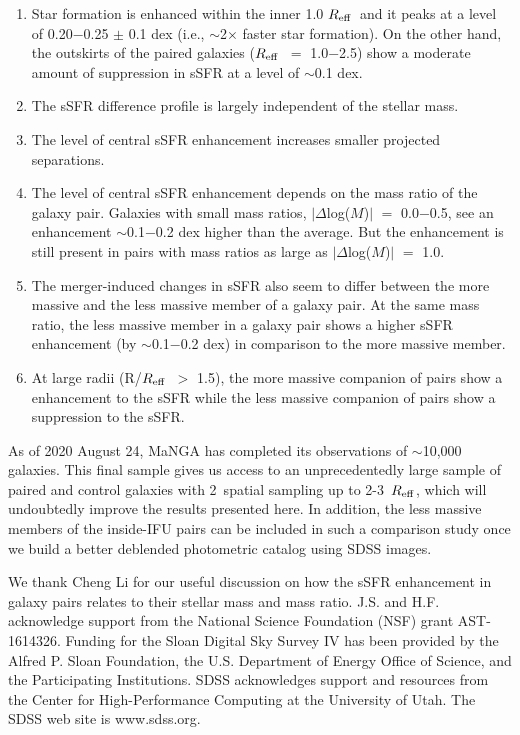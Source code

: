 \documentclass[iop,revtex4,twocolumn,apj,numberedappendix,appendixfloats]{emulateapj}
\newcommand{\reff}{$R_{\rm eff}$}
\begin{document}
\begin{enumerate}

\item Star formation is enhanced within the inner 1.0 \reff\ and it peaks at a level of 0.20$-$0.25 $\pm$ 0.1 dex (i.e., $\sim$2$\times$ faster star formation). On the other hand, the outskirts of the paired galaxies (\reff\ $=$ 1.0$-$2.5) show a moderate amount of suppression in sSFR at a level of $\sim$0.1 dex.
 
\item The sSFR difference profile is largely independent of the stellar mass.

\item The level of central sSFR enhancement increases smaller projected separations. 

\item The level of central sSFR enhancement depends on the mass ratio of the galaxy pair. Galaxies with small mass ratios, $|\Delta$log($M$)$|$ $=$ 0.0$-$0.5, see an enhancement $\sim$0.1$-$0.2 dex higher than the average. But the enhancement is still present in pairs with mass ratios as large as $|\Delta$log($M$)$|$ $=$ 1.0. 

\item The merger-induced changes in sSFR also seem to differ between the more massive and the less massive member of a galaxy pair. At the same mass ratio, the less massive member in a galaxy pair shows a higher sSFR enhancement (by $\sim$0.1$-$0.2 dex) in comparison to the more massive member. 

\item At large radii (R/\reff\ $>$ 1.5), the more massive companion of pairs show a enhancement to the sSFR while the less massive companion of pairs show a suppression to the sSFR.

\end{enumerate}

As of 2020 August 24, MaNGA has completed its observations of $\sim$10,000 galaxies. This final sample gives us access to an unprecedentedly large sample of paired and control galaxies with 2\arcsec\ spatial sampling up to 2-3~\reff, which will undoubtedly improve the results presented here. In addition, the less massive members of the inside-IFU pairs can be included in such a comparison study once we build a better deblended photometric catalog using SDSS images.

\acknowledgments

We thank Cheng Li for our useful discussion on how the sSFR enhancement in galaxy pairs relates to their stellar mass and mass ratio. J.S. and H.F. acknowledge support from the National Science Foundation (NSF) grant AST-1614326. Funding for the Sloan Digital Sky Survey IV has been provided by the Alfred P. Sloan Foundation, the U.S. Department of Energy Office of Science, and the Participating Institutions. SDSS acknowledges support and resources from the Center for High-Performance Computing at the University of Utah. The SDSS web site is www.sdss.org.
\end{document}
